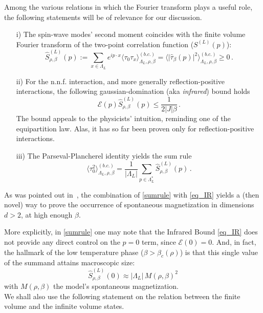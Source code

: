 \documentclass[a4paper,oneside,11pt]{article}
\newcommand{\be}[1]{\begin{equation}\label{#1}}
\newcommand{\ee}{\end{equation}}
\numberwithin{equation}{section}
\numberwithin{equation}{section}
\numberwithin{equation}{section}
\def\be{\begin{equation}}
\def\ee{\end{equation}}
\begin{document}
Among the various  relations in which the Fourier transform plays a useful role,  the following statements  will be of relevance for our discussion.
\begin{itemize} 
 \item[i)]   The  spin-wave modes' second moment coincides with the finite volume Fourier transform of the two-point correlation function ($S^{(L)}(p)$): 
\be
\widehat S^{(L)}_{\rho,\beta}(p)   :=  \sum_{x\in \Lambda_L} e^{ip\cdot x} \langle \tau_0 \tau_x \rangle_{\Lambda_L,\rho,\beta}^{(b.c.)}  = 
  \langle  \vert  \widehat \tau_\beta(p)\vert^2  \rangle_{\Lambda_L,\rho,\beta}^{(b.c.)}   \geq  0\,.
\ee 


 \item[ii)]  For the n.n.f. interaction, and more generally reflection-positive interactions, the following gaussian-domination (aka \emph{infrared}) bound holds~\cite{FILS78,FroSimSpe76}
\be \label{eq_IR}
\mathcal E(p) \widehat S^{(L)}_{\rho,\beta}(p) \leq \frac{1}{2|J|\beta}  \,. 
\ee 
The bound appeals to the physicists' intuition, reminding one of  the equipartition law.    Alas, it has so far been proven only for reflection-positive interactions. 
 \item[iii)]   The Parseval-Plancherel identity yields the sum rule 
\be \label{sumrule}
\langle \tau_0^2 \rangle_{\Lambda_L,\rho,\beta}^{(b.c.)}  =   \frac{1}{\vert \Lambda_L\vert} \sum_{p\in \Lambda_L^*} \widehat S^{(L)}_{\rho,\beta}(p)\,. 
\ee 
\end{itemize} 
As was pointed out in~\cite{FroSimSpe76}, the combination of  \eqref{sumrule} with \eqref{eq_IR} yields 
a (then novel) way to prove the occurrence of spontaneous magnetization in dimensions $d>2$, at  high enough $\beta$. 


More explicitly, in \eqref{sumrule}  one may note that the Infrared Bound \eqref{eq_IR}  does not provide any direct control on the  $p=0$ term, since $\mathcal E(0)=0$.   And, in fact,  the hallmark of the low temperature phase ($\beta > \beta_c(\rho)$) is that   
this single value of the summand attains  macroscopic size: 
 \be 
 \widehat S^{(L)}_{\rho,\beta}(0) \approx \vert \Lambda_L\vert \, M(\rho,\beta)^2
 \ee 
 with $M(\rho,\beta)$ the model's spontaneous magnetization.  \\ 
 
We shall also use the following statement on the relation between the finite volume and the infinite volume states.  
\end{document}
